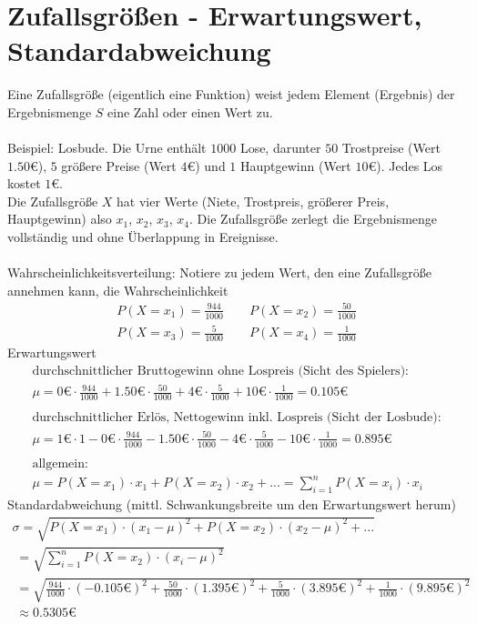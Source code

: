 \section{Zufallsgrößen - Erwartungswert, Standardabweichung}
Eine Zufallsgröße (eigentlich eine Funktion) weist jedem Element (Ergebnis) der Ergebnismenge $S$ eine Zahl oder einen Wert zu. \\\\
Beispiel: Losbude. Die Urne enthält $1000$ Lose, darunter $50$ Trostpreise (Wert $1.50€$), $5$ größere Preise (Wert $4€$) und $1$ Hauptgewinn (Wert $10€$). Jedes Los kostet $1€$. \\
Die Zufallsgröße $X$ hat vier Werte (Niete, Trostpreis, größerer Preis, Hauptgewinn) also $x_1$, $x_2$, $x_3$, $x_4$. Die Zufallsgröße zerlegt die Ergebnismenge vollständig und ohne Überlappung in Ereignisse. \\\\
Wahrscheinlichkeitsverteilung: Notiere zu jedem Wert, den eine Zufallsgröße annehmen kann, die Wahrscheinlichkeit
\begin{gather*}
  P(X = x_1) = \frac{944}{1000} \qquad P(X = x_2) = \frac{50}{1000} \\
  P(X = x_3) = \frac{5}{1000} \qquad P(X = x_4) = \frac{1}{1000}
\end{gather*}
Erwartungswert
\begin{gather*}
  \text{durchschnittlicher Bruttogewinn ohne Lospreis (Sicht des Spielers):} \\
  \mu = 0€ \cdot \frac{944}{1000} + 1.50€ \cdot \frac{50}{1000} + 4€ \cdot \frac{5}{1000} + 10€ \cdot \frac{1}{1000} = 0.105€ \\\\
  \text{durchschnittlicher Erlös, Nettogewinn inkl. Lospreis (Sicht der Losbude):} \\
  \mu = 1€ \cdot 1 - 0€ \cdot \frac{944}{1000} - 1.50€ \cdot \frac{50}{1000} - 4€ \cdot \frac{5}{1000} - 10€ \cdot \frac{1}{1000} = 0.895€ \\\\
  \text{allgemein:} \\
  \mu = P(X = x_1) \cdot x_1 + P(X = x_2) \cdot x_2 + ... = \sum_{i = 1}^n P(X = x_i) \cdot x_i
\end{gather*}
Standardabweichung (mittl. Schwankungsbreite um den Erwartungswert herum)
\begin{gather*}
  \sigma = \sqrt{P(X = x_1) \cdot (x_1 - \mu)^2 + P(X = x_2) \cdot (x_2 - \mu)^2 + ...} \\
  \;= \sqrt{\sum_{i = 1}^n P(X = x_2) \cdot (x_i - \mu)^2} \\
  \;= \sqrt{\frac{944}{1000} \cdot (-0.105€)^2 + \frac{50}{1000} \cdot (1.395€)^2 + \frac{5}{1000} \cdot (3.895€)^2 + \frac{1}{1000} \cdot (9.895€)^2} \\
  \;\approx 0.5305€
\end{gather*}

